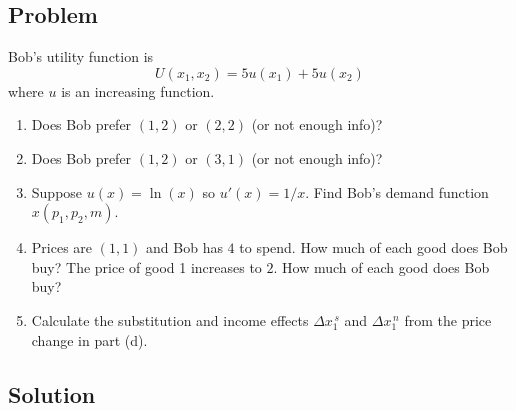 \documentclass[12pt]{article}
\begin{document}
\subsection*{Problem}
Bob's utility function is
\[
U(x_1,x_2)=5u(x_1)+5u(x_2)
\]
where \(u\) is an increasing function.
\begin{enumerate}[label=(\alph*), leftmargin=*]
\item Does Bob prefer \((1,2)\) or \((2,2)\) (or not enough info)?
\item Does Bob prefer \((1,2)\) or \((3,1)\) (or not enough info)?
\item Suppose \(u(x)=\ln(x)\) so \(u'(x)=1/x\). Find Bob's demand function \(x(p_1,p_2,m)\).
\item Prices are \((1,1)\) and Bob has \(4\) to spend. How much of each good does Bob buy?
The price of good 1 increases to \(2\). How much of each good does Bob buy?
\item Calculate the substitution and income effects \(\Delta x_1^{\,s}\) and \(\Delta x_1^{\,n}\) from the price change in part (d).
\end{enumerate}

\subsection*{Solution}
\end{document}
